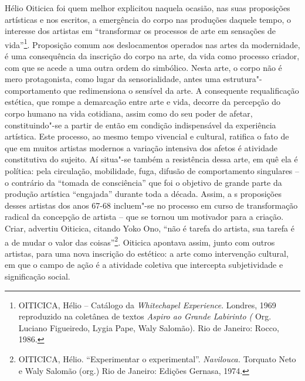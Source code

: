 Hélio Oiticica foi quem melhor explicitou naquela ocasião, nas suas
proposições artísticas e nos escritos, a emergência do corpo nas
produções daquele tempo, o interesse dos artistas em ``transformar os
processos de arte em sensações de vida''\footnote{\textsc{OITICICA}, Hélio --
  Catálogo da \emph{Whitechapel Experience}. Londres, 1969 reproduzido
  na coletânea de textos \emph{Aspiro ao Grande Labirinto (} Org.
  Luciano Figueiredo, Lygia Pape, Waly Salomão). Rio de Janeiro: Rocco,
  1986.}. Proposição comum aos deslocamentos operados nas artes da
modernidade, é uma consequência da inscrição do corpo na arte, da vida
como processo criador, com que se acede a uma outra ordem do simbólico.
Nesta arte, o corpo não é mero protagonista, como lugar da
sensorialidade, antes uma estrutura"-comportamento que redimensiona o
sensível da arte. A consequente requalificação estética, que rompe a
demarcação entre arte e vida, decorre da percepção do corpo humano na
vida cotidiana, assim como do seu poder de afetar, constituindo"-se a
partir de então em condição indispensável da experiência artística. Este
processo, ao mesmo tempo vivencial e cultural, ratifica o fato de que em
muitos artistas modernos a variação intensiva dos afetos é atividade
constitutiva do sujeito. Aí situa"-se também a resistência dessa arte, em
quê ela é política: pela circulação, mobilidade, fuga, difusão de
comportamento singulares -- o contrário da ``tomada de consciência'' que
foi o objetivo de grande parte da produção artística ``engajada''
durante toda a década. Assim, a s proposições desses artistas dos anos
67-68 incluem"-se no processo em curso de transformação radical da
concepção de artista -- que se tornou um motivador para a criação.
Criar, advertiu Oiticica, citando Yoko Ono, ``não é tarefa do artista,
sua tarefa é a de mudar o valor das coisas''\footnote{\textsc{OITICICA}, Hélio.
  ``Experimentar o experimental''. \emph{Navilouca.} Torquato Neto e
  Waly Salomão (org.) Rio de Janeiro: Edições Gernasa, 1974.}. Oiticica
apontava assim, junto com outros artistas, para uma nova inscrição do
estético: a arte como intervenção cultural, em que o campo de ação é a
atividade coletiva que intercepta subjetividade e significação social.

